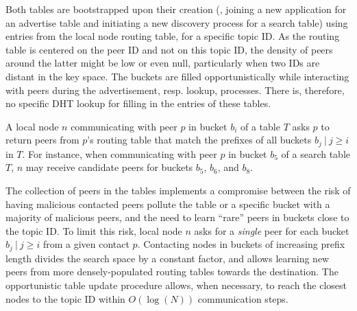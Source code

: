 
Both tables are bootstrapped upon their creation (\ie, joining a new application for an advertise table and initiating a new discovery process for a search table) using entries from the local node routing table, for a specific topic ID.
As the routing table is centered on the peer ID and not on this topic ID, the density of peers around the latter might be low or even null, particularly when two IDs are distant in the key space.
The buckets are filled opportunistically while interacting with peers during the advertisement, resp. lookup, processes.
There is, therefore, no specific DHT lookup for filling in the entries of these tables.

A local node $n$ communicating with peer $p$ in bucket $b_i$ of a table $T$ asks $p$ to return peers from $p$'s routing table that match the prefixes of all buckets $b_j \:|\: j \geq i$ in $T$.
For instance, when communicating with peer $p$ in bucket $b_{5}$ of a search table $T$, $n$ may receive candidate peers for buckets $b_5$, $b_6$, and $b_8$.

The collection of peers in the tables implements a compromise between the risk of having malicious contacted peers pollute the table or a specific bucket with a majority of malicious peers, and the need to learn ``rare'' peers in buckets close to the topic ID.
To limit this risk, local node $n$ asks for a \emph{single} peer for each bucket $b_j \:|\: j \geq i$ from a given contact $p$.
Contacting nodes in buckets of increasing prefix length divides the search space by a constant factor, and allows learning new peers from more densely-populated routing tables towards the destination.
The opportunistic table update procedure allows, when necessary, to reach the closest nodes to the topic ID within $O(\log(N))$ communication steps.

